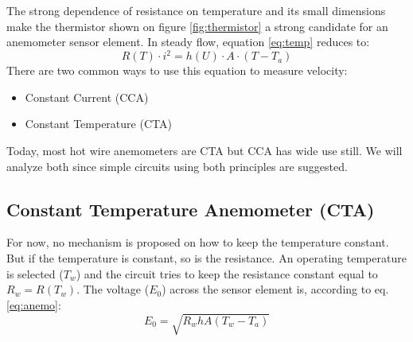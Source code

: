\documentclass[10pt,fleqn,a4paper,twoside]{article}
\begin{document}
The strong dependence of resistance on temperature and its small dimensions make the thermistor shown on figure \ref{fig:thermistor} a strong candidate for an anemometer sensor element. In steady flow, equation \ref{eq:temp} reduces to:
\begin{equation}
  R(T)\cdot i^2 = h(U)\cdot A \cdot \left(T - T_a\right)
  \label{eq:anemo}
\end{equation}
There are two common ways to use this equation to measure velocity:
\begin{itemize}
\item Constant Current (CCA)
\item Constant Temperature (CTA)
\end{itemize}
Today, most hot wire anemometers are CTA but CCA has wide use still. We will analyze both since simple circuits using both principles are suggested.

\subsection{Constant Temperature Anemometer (CTA)}
For now, no mechanism is proposed on how to keep the temperature constant. But if the temperature is constant, so is the resistance. An operating temperature is selected ($T_w$) and the circuit tries to keep the resistance constant equal to $R_w = R(T_w)$. The voltage ($E_0$)  across the sensor element is, according to eq. \ref{eq:anemo}:
\begin{equation}
  E_0 = \sqrt{R_w h A \left(T_w - T_a\right) }
  \label{eq:cta}
\end{equation}
\end{document}
